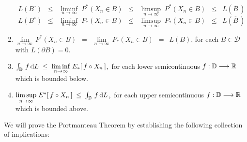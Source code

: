 \begin{theorem}
\begin{enumerate}
	\begin{equation*}
	L(B^{\circ})
	\;\; \leq \;\;
		\underset{n\rightarrow\infty}{\liminf}\; P^{*}(X_{n} \in B)
	\;\; \leq \;\;
		\underset{n\rightarrow\infty}{\limsup}\; P^{*}(X_{n} \in B)
	\;\; \leq \;\;
		L(\overline{B}\,)
	\end{equation*}
	\begin{equation*}
	L(B^{\circ})
	\;\;\leq\;\;
		\underset{n\rightarrow\infty}{\liminf}\; P_{*}(X_{n} \in B)
	\;\;\leq\;\;
		\underset{n\rightarrow\infty}{\limsup}\; P_{*}(X_{n} \in B)
	\;\;\leq\;\;
		L(\overline{B}\,)
	\end{equation*}
\item
	{\color{red}$\underset{n\rightarrow\infty}{\lim}\,P^{*}(X_{n} \in B)$
	\,$=$\, $\underset{n\rightarrow\infty}{\lim}\,P_{*}(X_{n} \in B)$
	\,$=$\, $L(B)$,
	for each $B \in \mathcal{D}$ with $L(\partial B) = 0$.}
\item
	$\int_{\mathbb{D}}\, f \,\textnormal{d} L \;\leq\; \underset{n\rightarrow\infty}{\liminf}\; E_{*}\!\left[\,f \circ X_{n}\,\right]$,\,
	for each lower semicontinuous $f : \mathbb{D} \longrightarrow \mathbb{R}$ which is bounded below.
\item
	$\underset{n\rightarrow\infty}{\limsup}\; E^{*}\!\left[\,f \circ X_{n}\,\right] \;\leq\; \int_{\mathbb{D}}\, f \,\textnormal{d} L$,\,
	for each upper semicontinuous $f : \mathbb{D} \longrightarrow \mathbb{R}$ which is bounded above.
\end{enumerate}
\end{theorem}
\proof
We will prove the Portmanteau Theorem by establishing the following collection
of implications:
\vskip 0.5cm
\begin{center}
\end{center}


